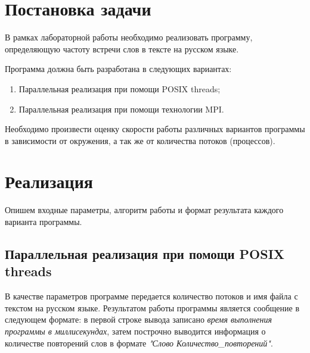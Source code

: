 \documentclass[12pt,a4paper]{report}
\begin{document}
	
	
	\renewcommand{\thesection}{\arabic{section}}
	\tableofcontents
	\pagebreak
	
	\setcounter{totalnumber}{10}
	\setcounter{topnumber}{10}
	\setcounter{bottomnumber}{10}
	\renewcommand{\topfraction}{1}
	\renewcommand{\textfraction}{0}
	
	\section{Постановка задачи}
		В рамках лабораторной работы необходимо реализовать программу, определяющую частоту встречи слов в тексте на русском языке. 
		
		Программа должна быть разработана в следующих вариантах:
		\begin{enumerate}
			\item Параллельная реализация при помощи POSIX threads;
			\item Параллельная реализация при помощи технологии MPI.
		\end{enumerate}
		
		Необходимо произвести оценку скорости работы различных вариантов программы в зависимости от окружения, а так же от количества потоков (процессов).
		
	\section{Реализация}
		Опишем входные параметры, алгоритм работы и формат результата каждого варианта программы.
				
		\subsection{Параллельная реализация при помощи POSIX threads}
			В качестве параметров программе передается количество потоков и имя файла с текстом на русском языке. Результатом работы программы является сообщение в следующем формате: в первой строке вывода записано \textit{время выполнения программы в миллисекундах}, затем построчно выводится информация о количестве повторений слов в формате \textit{"Слово Количество\_повторений"}.
					
\end{document}
